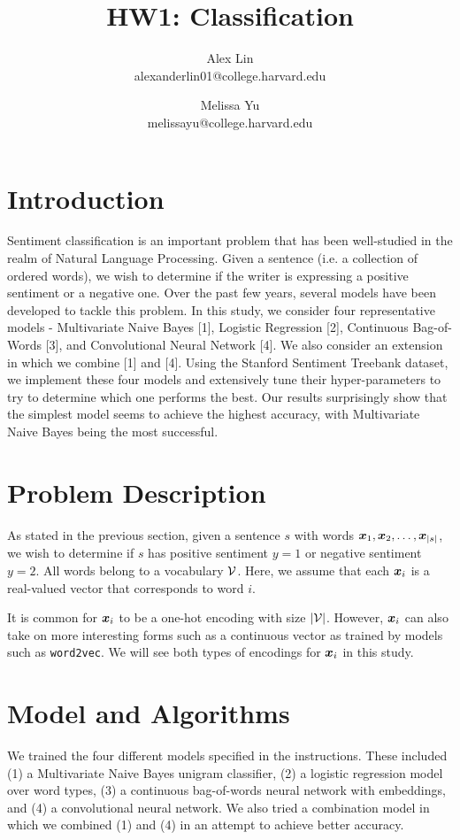 \documentclass[11pt]{article}
\title{HW1: Classification}
\author{Alex Lin \\ alexanderlin01@college.harvard.edu \and Melissa Yu \\ melissayu@college.harvard.edu }
\begin{document}
\maketitle{}
\section{Introduction}

Sentiment classification is an important problem that has been well-studied in the realm of Natural Language Processing.  Given a sentence (i.e. a collection of ordered words), we wish to determine if the writer is expressing a positive sentiment or a negative one.  Over the past few years, several models have been developed to tackle this problem.  In this study, we consider four representative models - Multivariate Naive Bayes [1], Logistic Regression [2], Continuous Bag-of-Words [3], and Convolutional Neural Network [4].  We also consider an extension in which we combine [1] and [4].  Using the Stanford Sentiment Treebank dataset, we implement these four models and extensively tune their hyper-parameters to try to determine which one performs the best.  Our results surprisingly show that the simplest model seems to achieve the highest accuracy, with Multivariate Naive Bayes being the most successful.   


\section{Problem Description}

As stated in the previous section, given a sentence $s$ with words $\boldsymbol{x}_1, \boldsymbol{x}_2, \ldots, \boldsymbol{x}_{\lvert s \rvert}$, we wish to determine if $s$ has positive sentiment $y = 1$ or negative sentiment $y = 2$.  All words belong to a vocabulary $\mathcal{V}$.   Here, we assume that each $\boldsymbol{x}_i$ is a real-valued vector that corresponds to word $i$.

It is common for $\boldsymbol{x}_i$ to be a one-hot encoding with size $|\mathcal{V}|$.  However, $\boldsymbol{x}_i$ can also take on more interesting forms such as a continuous vector as trained by models such as \texttt{word2vec}.  We will see both types of encodings for $\boldsymbol{x}_i$ in this study.     

\section{Model and Algorithms}

We trained the four different models specified in the instructions.  These included (1) a Multivariate Naive Bayes unigram classifier, (2) a logistic regression model over word types, (3) a continuous bag-of-words neural network with embeddings, and (4) a convolutional neural network.  We also tried a combination model in which we combined (1) and (4) in an attempt to achieve better accuracy.  
\end{document}
